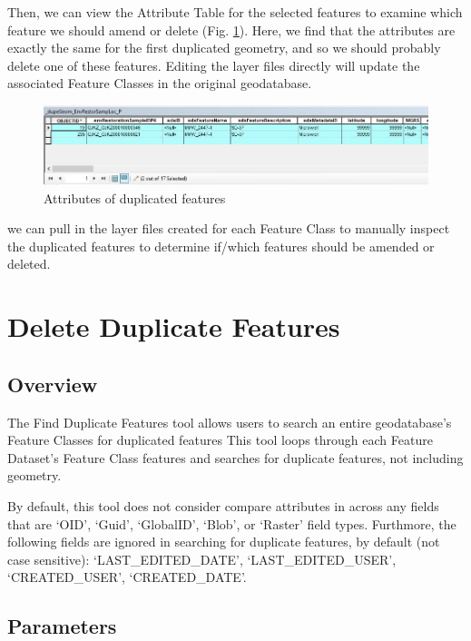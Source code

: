 \documentclass[openany]{book}
\theoremstyle{definition}
\theoremstyle{definition}
\theoremstyle{definition}
\theoremstyle{remark}
\begin{document}
Then, we can view the Attribute Table for the selected features to
examine which feature we should amend or delete (Fig.
\ref{fig:layAtts}). Here, we find that the attributes are exactly the
same for the first duplicated geometry, and so we should probably delete
one of these features. Editing the layer files directly will update the
associated Feature Classes in the original geodatabase.

\begin{figure}[H]

{\centering \includegraphics{figures/dupG-layAtts} 

}

\caption{Attributes of duplicated features}\label{fig:layAtts}
\end{figure}

we can pull in the layer files created for each Feature Class to
manually inspect the duplicated features to determine if/which features
should be amended or deleted.

\chapter{Delete Duplicate Features}\label{delFeats}

\section{Overview}\label{overview-3}

The Find Duplicate Features tool allows users to search an entire
geodatabase's Feature Classes for duplicated features This tool loops
through each Feature Dataset's Feature Class features and searches for
duplicate features, not including geometry.

By default, this tool does not consider compare attributes in across any
fields that are `OID', `Guid', `GlobalID', `Blob', or `Raster' field
types. Furthmore, the following fields are ignored in searching for
duplicate features, by default (not case sensitive):
`LAST\_EDITED\_DATE', `LAST\_EDITED\_USER', `CREATED\_USER',
`CREATED\_DATE'.

\section{Parameters}\label{parameters-3}
\end{document}
